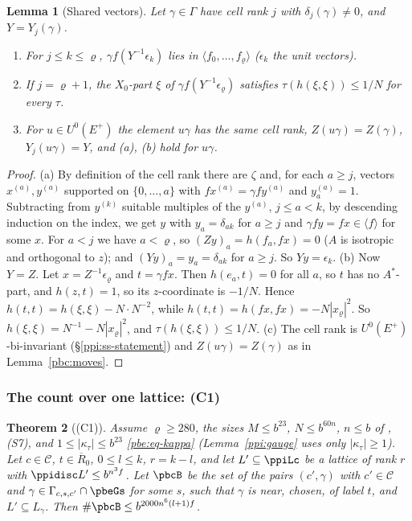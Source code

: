\documentclass[10pt]{amsart}
\newtheorem{theorem}{Theorem}[section]
\newtheorem{lemma}[theorem]{Lemma}
\theoremstyle{definition}
\theoremstyle{remark}
\providecommand{\pbR}{\overline R_0}
\begin{document}
\begin{lemma}[Shared vectors]\label{pbc:shared}
Let $\gamma\in\Gamma$ have cell rank $j$ with $\delta_j(\gamma)\ne0$, and $Y=Y_j(\gamma)$.
\begin{enumerate}
\item[(a)] For $j\le k\le\varrho$, $\gamma f(Y^{-1}\epsilon_k)$ lies in $\langle f_0,\dots,f_\varrho\rangle$
($\epsilon_k$ the unit vectors).
\item[(b)] If $j=\varrho+1$, the $X_0$-part $\xi$ of $\gamma f(Y^{-1}\epsilon_\varrho)$ satisfies
$\tau(h(\xi,\xi))\le1/N$ for every $\tau$.
\item[(c)] For $u\in U^0(E^+)$ the element $u\gamma$ has the same cell rank, $Z(u\gamma)=Z(\gamma)$,
$Y_j(u\gamma)=Y$, and \textup{(a)}, \textup{(b)} hold for $u\gamma$.
\end{enumerate}
\end{lemma}
\begin{proof}
(a) By definition of the cell rank there are $\zeta$ and, for each $a\ge j$, vectors $x^{(a)},y^{(a)}$
supported on $\{0,\dots,a\}$ with $fx^{(a)}=\gamma fy^{(a)}$ and $y^{(a)}_a=1$. Subtracting from
$y^{(k)}$ suitable multiples of the $y^{(a)}$, $j\le a<k$, by descending induction on the index, we
get $y$ with $y_a=\delta_{ak}$ for $a\ge j$ and $\gamma fy=fx\in\langle f\rangle$ for some $x$. For
$a<j$ we have $a<\varrho$, so $(Zy)_a=h(f_a,fx)=0$ ($A$ is isotropic and orthogonal to $z$); and $(Yy)_a=
y_a=\delta_{ak}$ for $a\ge j$. So $Yy=\epsilon_k$.
(b) Now $Y=Z$. Let $x=Z^{-1}\epsilon_\varrho$ and $t=\gamma fx$. Then $h(e_a,t)=0$ for all $a$, so $t$
has no $A^*$-part, and $h(z,t)=1$, so its $z$-coordinate is $-1/N$. Hence $h(t,t)=h(\xi,\xi)-N\cdot N^{-2}$,
while $h(t,t)=h(fx,fx)=-N|x_\varrho|^2$. So $h(\xi,\xi)=N^{-1}-N|x_\varrho|^2$, and $\tau(h(\xi,\xi))\le
1/N$.
(c) The cell rank is $U^0(E^+)$-bi-invariant (\S\ref{ppi:ss-statement}) and $Z(u\gamma)=Z(\gamma)$ as
in Lemma~\ref{pbc:moves}.
\end{proof}

\subsubsection{The count over one lattice: (C1)}\label{pbc:ss-C1}

\begin{theorem}[(C1)]\label{pbc:C1}
Assume $\varrho\ge280$, the sizes $M\le b^{23}$, $N\le b^{60n}$, $n\le b$ of {\cite[Lemma~13.4\textup{(S5)}]{P46}}, \textup{(S7)},
and $1\le|\kappa_\tau|\le b^{23}$ \eqref{pbe:eq-kappa} (Lemma~\ref{ppi:gauge} uses only $|\kappa_\tau|\ge1$). Let $c\in
\mathcal C$, $t\in\pbR$, $0\le l\le k$, $r=k-l$, and let $L'\subseteq\ppiLc$ be a lattice of rank $r$ with
$\ppidisc L'\le b^{n^3f}$. Let $\pbcB$ be the set of the pairs $(c',\gamma)$ with $c'\in\mathcal C$ and
$\gamma\in\Gamma_{c,s,c'}\cap\pbeGs$ for some $s$, such that $\gamma$ is near, chosen, of label $t$, and
$L'\subseteq L_\gamma$. Then $\#\pbcB\le b^{2000n^6(l+1)f}$.
\end{theorem}
\end{document}
